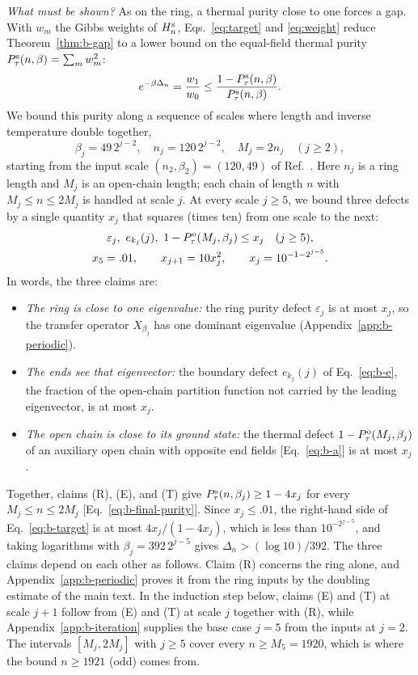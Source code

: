 \documentclass[aps,prl,reprint,amsmath,amssymb,nofootinbib,raggedbottom]{revtex4-2}
\begin{document}
\emph{What must be shown?} As on the ring, a thermal purity close to one forces
a gap. With $w_m$ the Gibbs weights of $H_n^{\mathrm{s}}$, Eqs.~\eqref{eq:target}
and \eqref{eq:weight} reduce Theorem~\ref{thm:b-gap} to a lower bound on the
equal-field thermal purity $P_{\tau}^{\mathrm{s}}(n,\beta)=\sum_mw_m^2$:
\begin{equation}
 e^{-\beta\Delta_n}=\frac{w_1}{w_0}
 \le\frac{1-P_{\tau}^{\mathrm{s}}(n,\beta)}{P_{\tau}^{\mathrm{s}}(n,\beta)}.
 \label{eq:b-target}
\end{equation}
We bound this purity along a sequence of scales where length and
inverse temperature double together,
\begin{equation}
 \beta_j=49\,2^{j-2},\quad n_j=120\,2^{j-2},\quad
 M_j=2n_j\quad(j\ge2),
 \label{eq:b-scales}
\end{equation}
starting from the input scale $(n_2,\beta_2)=(120,49)$ of
Ref.~\cite{boundary}. Here $n_j$ is a ring length and $M_j$ is an open-chain
length; each chain of length $n$ with $M_j\le n\le2M_j$ is handled at scale $j$.
At every scale $j\ge5$, we bound three defects by a single quantity $x_j$ that
squares (times ten) from one scale to the next:
\begin{equation}
 \begin{gathered}
 \varepsilon_j,\ e_{k_j}(j),\ 1-P_{\tau}^{\mathrm{o}}(M_j,\beta_j)\le x_j\quad(j\ge5),\\
 x_5=.01,\qquad x_{j+1}=10x_j^2,\qquad
 x_j=10^{-1-2^{j-5}}.
 \end{gathered}
 \label{eq:b-x}
\end{equation}
In words, the three claims are:
\begin{itemize}
\item[(R)] \emph{The ring is close to one eigenvalue:} the ring purity defect
$\varepsilon_j$ is at most $x_j$, so the transfer operator $X_{\beta_j}$ has
one dominant eigenvalue (Appendix~\ref{app:b-periodic}).
\item[(E)] \emph{The ends see that eigenvector:} the boundary defect
$e_{k_j}(j)$ of Eq.~\eqref{eq:b-e}, the fraction of the open-chain partition
function not carried by the leading eigenvector, is at most $x_j$.
\item[(T)] \emph{The open chain is close to its ground state:} the thermal
defect $1-P_{\tau}^{\mathrm{o}}(M_j,\beta_j)$ of an auxiliary open chain with opposite end
fields [Eq.~\eqref{eq:b-a}] is at most $x_j$.
\end{itemize}
Together, claims (R), (E), and (T) give $P_{\tau}^{\mathrm{s}}(n,\beta_j)\ge1-4x_j$ for
every $M_j\le n\le2M_j$ [Eq.~\eqref{eq:b-final-purity}]. Since $x_j\le.01$, the
right-hand side of Eq.~\eqref{eq:b-target} is at most $4x_j/(1-4x_j)$, which is
less than $10^{-2^{j-5}}$, and taking logarithms with $\beta_j=392\,2^{j-5}$
gives $\Delta_n>(\log10)/392$. The three claims depend on each other as
follows. Claim (R) concerns the ring alone, and
Appendix~\ref{app:b-periodic} proves it from the ring inputs by the doubling
estimate of the main text. In the induction step below, claims (E) and (T) at
scale $j+1$ follow from (E) and (T) at scale $j$ together with (R), while
Appendix~\ref{app:b-iteration} supplies the base case $j=5$ from the inputs at
$j=2$. The intervals $[M_j,2M_j]$ with $j\ge5$ cover every $n\ge M_5=1920$,
which is where the bound $n\ge1921$ (odd) comes from.
\end{document}
